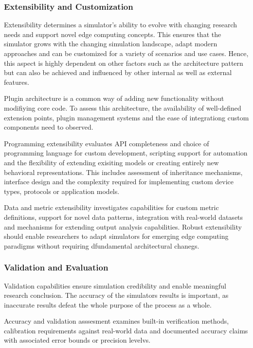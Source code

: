 \subsubsection{Extensibility and Customization}
Extensibility determines a simulator's ability to evolve with changing research needs and support novel edge computing concepts.
This ensures that the simulator grows with the changing simulation landscape, adapt modern approaches and can be customized for a variety of scenarios and use cases.
Hence, this aspect is highly dependent on other factors such as the architecture pattern but can also be achieved and influenced by other internal as well as external features.

Plugin architecture is a common way of adding new functionality without modifiying core code.
To assess this architecture, the availability of well-defined extension points, plugin management systems and the ease of integrationg custom components need to observed.

Programming extensibility evaluates API completeness and choice of programming language for custom development, scripting support for automation and the flexibility of extending exisiting models or creating entirely new behavioral representations.
This includes assessment of inheritance mechanisms, interface design and the complexity required for implementing custom device types, protocols or application models.

Data and metric extensibility investigates capabilities for custom metric definitions, support for novel data patterns, integration with real-world datasets and mechanisms for extending output analysis capabilities.
Robust extensibility should enable researchers to adapt simulators for emerging edge computing paradigms without requiring dfundamental architectural chanegs.

\subsubsection{Validation and Evaluation}
Validation capabilities ensure simulation credibility and enable meaningful research conclusion.
The accuracy of the simulators results is important, as inaccurate results defeat the whole purpose of the process as a whole.

Accuracy and validation asssesment examines built-in verification methods, calibration requirements against real-world data and documented accuracy claims with associated error bounds or precision levelvs.

